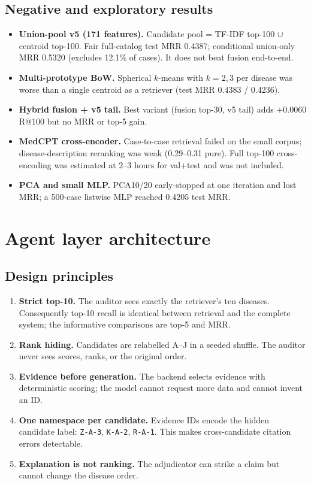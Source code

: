 \documentclass[11pt,a4paper]{article}
\newcommand{\code}[1]{\texttt{\small #1}}
\newcommand{\key}[1]{\textbf{#1}}
\begin{document}
\subsection{Negative and exploratory results}

\begin{itemize}[leftmargin=1.4em]
\item \textbf{Union-pool v5 (171 features).} Candidate pool = TF-IDF top-100
$\cup$ centroid top-100. Fair full-catalog test MRR 0.4387; conditional union-only
MRR 0.5320 (excludes 12.1\% of cases). It does not beat fusion end-to-end.
\item \textbf{Multi-prototype BoW.} Spherical $k$-means with $k=2,3$ per disease was
worse than a single centroid as a retriever (test MRR 0.4383 / 0.4236).
\item \textbf{Hybrid fusion + v5 tail.} Best variant (fusion top-30, v5 tail) adds
$+0.0060$ R@100 but no MRR or top-5 gain.
\item \textbf{MedCPT cross-encoder.} Case-to-case retrieval failed on the small
corpus; disease-description reranking was weak (0.29--0.31 pure). Full top-100
cross-encoding was estimated at 2--3 hours for val+test and was not included.
\item \textbf{PCA and small MLP.} PCA10/20 early-stopped at one iteration and lost
MRR; a 500-case listwise MLP reached 0.4205 test MRR.
\end{itemize}

\section{Agent layer architecture}

\subsection{Design principles}

\begin{enumerate}[leftmargin=1.4em]
\item \key{Strict top-10.} The auditor sees exactly the retriever's ten diseases.
Consequently top-10 recall is identical between retrieval and the complete system;
the informative comparisons are top-5 and MRR.
\item \key{Rank hiding.} Candidates are relabelled A--J in a seeded shuffle. The
auditor never sees scores, ranks, or the original order.
\item \key{Evidence before generation.} The backend selects evidence with
deterministic scoring; the model cannot request more data and cannot invent an ID.
\item \key{One namespace per candidate.} Evidence IDs encode the hidden candidate
label: \code{Z-A-3}, \code{K-A-2}, \code{R-A-1}. This makes cross-candidate citation
errors detectable.
\item \key{Explanation is not ranking.} The adjudicator can strike a claim but
cannot change the disease order.
\end{enumerate}
\end{document}
